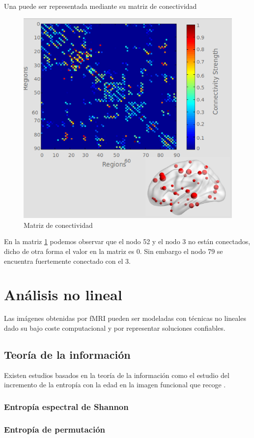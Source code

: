 Una puede ser representada mediante su matriz de conectividad

	\begin{figure}[H]
  		\centering
    	\includegraphics[scale=0.5]{img/matrix_conect.png}
  		\caption{Matriz de conectividad}         \label{preproc:matrix_conect}
	\end{figure}
	
En la matriz \ref{preproc:matrix_conect} podemos observar que el nodo 52 y el nodo 3 no están conectados, dicho de otra forma el valor en la matriz es 0. Sin embargo el nodo 79 se encuentra fuertemente conectado con el 3.

\section{Análisis no lineal}

Las imágenes obtenidas por fMRI pueden ser modeladas con técnicas no lineales dado su bajo coste computacional y por representar soluciones confiables.  

\subsection{Teoría de la información}

Existen estudios basados en la teoría de la información como el estudio del incremento de la entropía con la edad en la imagen funcional que recoge \cite{Yao2013}. 

\subsubsection{Entropía espectral de Shannon}


\subsubsection{Entropía de permutación}